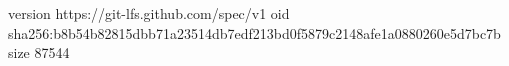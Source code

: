 version https://git-lfs.github.com/spec/v1
oid sha256:b8b54b82815dbb71a23514db7edf213bd0f5879c2148afe1a0880260e5d7bc7b
size 87544
